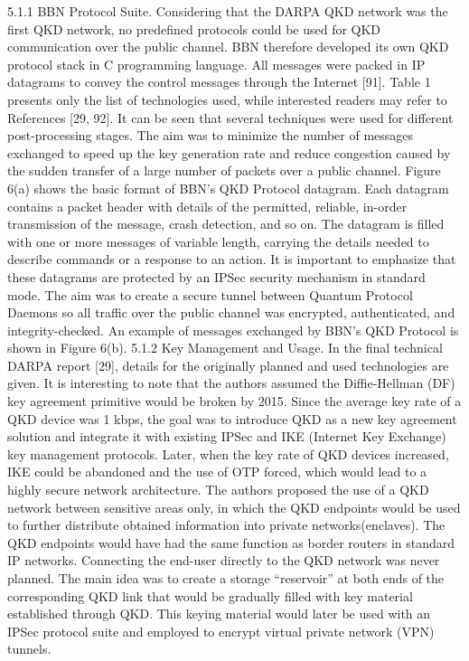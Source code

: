 5.1.1 BBN Protocol Suite. Considering that the DARPA QKD network was the first QKD network, no predefined protocols could be used for QKD communication over the public channel.
BBN therefore developed its own QKD protocol stack in C programming language. All messages were packed in IP datagrams to convey the control messages through the Internet [91].
Table 1 presents only the list of technologies used, while interested readers may refer to References [29, 92]. It can be seen that several techniques were used for different post-processing stages. The aim was to minimize the number of messages exchanged to speed up the key generation rate and reduce congestion caused by the sudden transfer of a large number of packets over a public channel. Figure 6(a) shows the basic format of BBN’s QKD Protocol datagram. Each datagram contains a packet header with details of the permitted, reliable, in-order transmission of the message, crash detection, and so on.
The datagram is filled with one or more messages of variable length, carrying the details needed to describe commands or a response to an action. It is important to emphasize that these datagrams are protected by an IPSec security mechanism in standard mode.
The aim was to create a secure tunnel between Quantum Protocol Daemons so all traffic over the public channel was encrypted, authenticated, and integrity-checked. An example of messages exchanged by BBN’s QKD Protocol is shown in Figure 6(b).
5.1.2 Key Management and Usage. In the final technical DARPA report [29], details for the originally planned and used technologies are given. It is interesting to note that the authors assumed the Diffie-Hellman (DF) key agreement primitive would be broken by 2015. Since the average key rate of a QKD device was 1 kbps, the goal was to introduce QKD as a new key agreement solution and integrate it with existing IPSec and IKE (Internet Key Exchange) key management protocols. Later, when the key rate of QKD devices increased, IKE could be abandoned and the use of OTP forced, which would lead to a highly secure network architecture.
The authors proposed the use of a QKD network between sensitive areas only, in which the QKD endpoints would be used to further distribute obtained information into private networks(enclaves). The QKD endpoints would have had the same function as border routers in standard IP networks. Connecting the end-user directly to the QKD network was never planned. The main idea was to create a storage “reservoir” at both ends of the corresponding QKD link that would be gradually filled with key material established through QKD. This keying material would later be used with an IPSec protocol suite and employed to encrypt virtual private network (VPN) tunnels.
